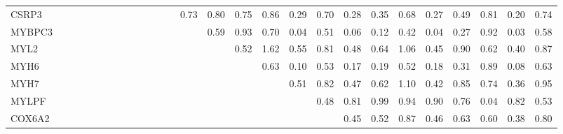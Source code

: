 \begin{longtable}{lrrrrrrrrrrrrrrrrrrrrrrrrrr}
CSRP3   &             &             &             &           &             &               &            &             &             &              &            &             &         0.73 &       0.80 &       0.75 &       0.86 &        0.29 &         0.70 &       0.28 &       0.35 &      0.68 &         0.27 &        0.49 &        0.81 &        0.20 &     0.74 \\
MYBPC3  &             &             &             &           &             &               &            &             &             &              &            &             &              &       0.59 &       0.93 &       0.70 &        0.04 &         0.51 &       0.06 &       0.12 &      0.42 &         0.04 &        0.27 &        0.92 &        0.03 &     0.58 \\
MYL2    &             &             &             &           &             &               &            &             &             &              &            &             &              &            &       0.52 &       1.62 &        0.55 &         0.81 &       0.48 &       0.64 &      1.06 &         0.45 &        0.90 &        0.62 &        0.40 &     0.87 \\
MYH6    &             &             &             &           &             &               &            &             &             &              &            &             &              &            &            &       0.63 &        0.10 &         0.53 &       0.17 &       0.19 &      0.52 &         0.18 &        0.31 &        0.89 &        0.08 &     0.63 \\
MYH7    &             &             &             &           &             &               &            &             &             &              &            &             &              &            &            &            &        0.51 &         0.82 &       0.47 &       0.62 &      1.10 &         0.42 &        0.85 &        0.74 &        0.36 &     0.95 \\
MYLPF   &             &             &             &           &             &               &            &             &             &              &            &             &              &            &            &            &             &         0.48 &       0.81 &       0.99 &      0.94 &         0.90 &        0.76 &        0.04 &        0.82 &     0.53 \\
COX6A2  &             &             &             &           &             &               &            &             &             &              &            &             &              &            &            &            &             &              &       0.45 &       0.52 &      0.87 &         0.46 &        0.63 &        0.60 &        0.38 &     0.80 \\

\end{longtable}
